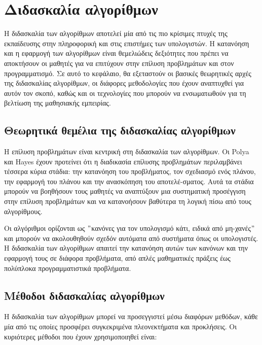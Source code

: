 \hideheader
\section{Διδασκαλία αλγορίθμων}

Η διδασκαλία των αλγορίθμων αποτελεί μία από τις πιο κρίσιμες πτυχές της εκπαίδευσης στην πληροφορική και στις επιστήμες των υπολογιστών. Η κατανόηση και η εφαρμογή των αλγορίθμων είναι θεμελιώδεις δεξιότητες που πρέπει να αποκτήσουν οι μαθητές για να επιτύχουν στην επίλυση προβλημάτων και στον προγραμματισμό. Σε αυτό το κεφάλαιο, θα εξεταστούν οι βασικές θεωρητικές αρχές της διδασκαλίας αλγορίθμων, οι διάφορες μεθοδολογίες που έχουν αναπτυχθεί για αυτόν τον σκοπό, καθώς και οι τεχνολογίες που μπορούν να ενσωματωθούν για τη βελτίωση της μαθησιακής εμπειρίας.

\subsection{Θεωρητικά θεμέλια της διδασκαλίας αλγορίθμων}

Η επίλυση προβλημάτων είναι κεντρική στη διδασκαλία των αλγορίθμων. Οι Polya και Hayes έχουν προτείνει ότι η διαδικασία επίλυσης προβλημάτων περιλαμβάνει τέσσερα κύρια στάδια: την κατανόηση του προβλήματος, τον σχεδιασμό ενός πλάνου, την εφαρμογή του πλάνου και την ανασκόπηση του αποτελέ-σματος\cite{bodner_role_1987,crepinsek_note_2012}. Αυτά τα στάδια μπορούν να βοηθήσουν τους μαθητές να αναπτύξουν μια συστηματική προσέγγιση στην επίλυση προβλημάτων και να κατανοήσουν βαθύτερα τη λογική πίσω από τους αλγορίθμους.

Οι αλγόριθμοι ορίζονται ως \("\)κανόνες για τον υπολογισμό κάτι, ειδικά από μη-χανές\("\) και μπορούν να ακολουθηθούν σχεδόν αυτόματα από συστήματα όπως οι υπολογιστές\cite{bodner_role_1987}. Η διδασκαλία των αλγορίθμων απαιτεί την κατανόηση αυτών των κανόνων και την εφαρμογή τους σε διάφορα προβλήματα, από απλές μαθηματικές πράξεις έως πολύπλοκα προγραμματιστικά προβλήματα.


\subsection{Μέθοδοι διδασκαλίας αλγορίθμων}

Η διδασκαλία των αλγορίθμων μπορεί να προσεγγιστεί μέσω διαφόρων μεθόδων, κάθε μία από τις οποίες προσφέρει συγκεκριμένα πλεονεκτήματα και προκλήσεις. Οι κυριότερες μέθοδοι που έχουν χρησιμοποιηθεί είναι:

